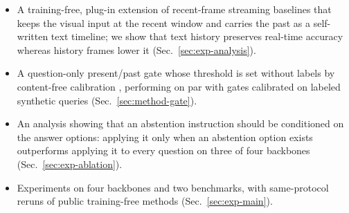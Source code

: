 \begin{itemize}
  \item A training-free, plug-in extension of recent-frame streaming baselines that keeps the visual input at the
        recent window and carries the past as a self-written text timeline; we show that text history preserves
        real-time accuracy whereas history frames lower it (Sec.~\ref{sec:exp-analysis}).
  \item A question-only present/past gate whose threshold is set without labels by content-free calibration
        \cite{zhao2021calibrate}, performing on par with gates calibrated on labeled synthetic queries
         (Sec.~\ref{sec:method-gate}).
  \item An analysis showing that an abstention instruction should be conditioned on the answer options:
        applying it only when an abstention option exists outperforms applying it to every question on three of four
        backbones (Sec.~\ref{sec:exp-ablation}).
  \item Experiments on four backbones and two benchmarks, with same-protocol reruns of public training-free methods
        (Sec.~\ref{sec:exp-main}).
\end{itemize}
